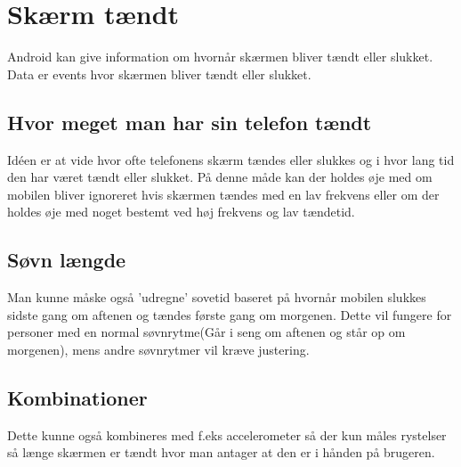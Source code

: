 \section{Skærm tændt}
Android kan give information om hvornår skærmen bliver tændt eller slukket. Data er events hvor skærmen bliver tændt eller slukket.

\subsection{Hvor meget man har sin telefon tændt}
Idéen er at vide hvor ofte telefonens skærm tændes eller slukkes og i hvor lang tid den har været tændt eller slukket. På denne måde kan der holdes øje med om mobilen bliver ignoreret hvis skærmen tændes med en lav frekvens eller om der holdes øje med noget bestemt ved høj frekvens og lav tændetid. 

\subsection{Søvn længde}
Man kunne måske også 'udregne' sovetid baseret på hvornår mobilen slukkes sidste gang om aftenen og tændes første gang om morgenen. Dette vil fungere for personer med en normal søvnrytme(Går i seng om aftenen og står op om morgenen), mens andre søvnrytmer vil kræve justering.

\subsection{Kombinationer}
Dette kunne også kombineres med f.eks accelerometer så der kun måles rystelser så længe skærmen er tændt hvor man antager at den er i hånden på brugeren.

